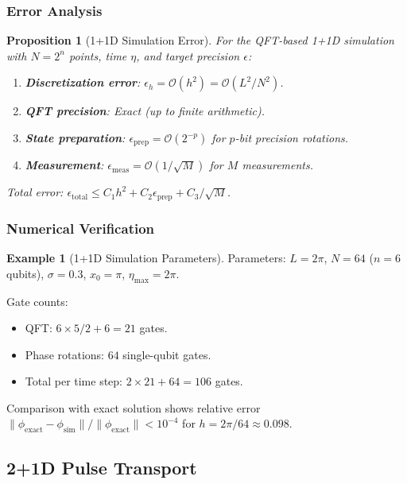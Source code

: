 \documentclass[11pt,a4paper]{article}
\newcommand{\Order}{\mathcal{O}}
\theoremstyle{plain}
\newtheorem{proposition}[theorem]{Proposition}
\theoremstyle{definition}
\newtheorem{example}[theorem]{Example}
\theoremstyle{remark}
\begin{document}
\subsubsection{Error Analysis}

\begin{proposition}[1+1D Simulation Error]\label{prop:1d_error}
For the QFT-based 1+1D simulation with $N = 2^n$ points, time $\eta$, and target precision $\epsilon$:
\begin{enumerate}
    \item \textbf{Discretization error}: $\epsilon_h = \Order(h^2) = \Order(L^2/N^2)$.
    \item \textbf{QFT precision}: Exact (up to finite arithmetic).
    \item \textbf{State preparation}: $\epsilon_{\text{prep}} = \Order(2^{-p})$ for $p$-bit precision rotations.
    \item \textbf{Measurement}: $\epsilon_{\text{meas}} = \Order(1/\sqrt{M})$ for $M$ measurements.
\end{enumerate}
Total error: $\epsilon_{\text{total}} \leq C_1 h^2 + C_2 \epsilon_{\text{prep}} + C_3/\sqrt{M}$.
\end{proposition}

\subsubsection{Numerical Verification}

\begin{example}[1+1D Simulation Parameters]
Parameters: $L = 2\pi$, $N = 64$ ($n = 6$ qubits), $\sigma = 0.3$, $x_0 = \pi$, $\eta_{\max} = 2\pi$.

Gate counts:
\begin{itemize}
    \item QFT: $6 \times 5 / 2 + 6 = 21$ gates.
    \item Phase rotations: $64$ single-qubit gates.
    \item Total per time step: $2 \times 21 + 64 = 106$ gates.
\end{itemize}

Comparison with exact solution shows relative error $\|\phi_{\text{exact}} - \phi_{\text{sim}}\|/\|\phi_{\text{exact}}\| < 10^{-4}$ for $h = 2\pi/64 \approx 0.098$.
\end{example}

\subsection{2+1D Pulse Transport}\label{subsec:2d_example}
\end{document}
